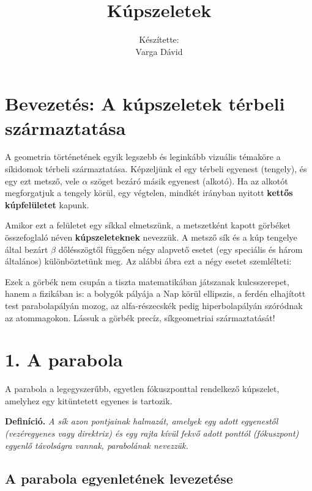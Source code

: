 \documentclass[12pt, a4paper]{article}
\newcommand{\textbfr}[1]{\textbf{\textcolor{bvred}{#1}}}
\begin{document}
\title{\textbfr{Kúpszeletek}}
\author{Készítette:\\Varga Dávid}
\date{}
\maketitle

\section*{Bevezetés: A kúpszeletek térbeli származtatása}

A geometria történetének egyik legszebb és leginkább vizuális témaköre a síkidomok térbeli származtatása. Képzeljünk el egy térbeli egyenest (tengely), és egy ezt metsző, vele $\alpha$ szöget bezáró másik egyenest (alkotó). Ha az alkotót megforgatjuk a tengely körül, egy végtelen, mindkét irányban nyitott \textbfr{kettős kúpfelületet} kapunk. 

Amikor ezt a felületet egy síkkal elmetszünk, a metszetként kapott görbéket összefoglaló néven \textbfr{kúpszeleteknek} nevezzük. A metsző sík és a kúp tengelye által bezárt $\beta$ dőlésszögtől függően négy alapvető esetet (egy speciális és három általános) különböztetünk meg. Az alábbi ábra ezt a négy esetet szemlélteti:



Ezek a görbék nem csupán a tiszta matematikában játszanak kulcsszerepet, hanem a fizikában is: a bolygók pályája a Nap körül ellipszis, a ferdén elhajított test parabolapályán mozog, az alfa-részecskék pedig hiperbolapályán szóródnak az atommagokon. Lássuk a görbék precíz, síkgeometriai származtatását!

\section*{1. A parabola}

A parabola a legegyszerűbb, egyetlen fókuszponttal rendelkező kúpszelet, amelyhez egy kitüntetett egyenes is tartozik.

\textbf{Definíció.} \textit{A sík azon pontjainak halmazát, amelyek egy adott egyenestől (vezéregyenes vagy direktrix) és egy rajta kívül fekvő adott ponttól (fókuszpont) egyenlő távolságra vannak, \textcolor{bvred}{parabolának} nevezzük.}

\subsection*{A parabola egyenletének levezetése}
\end{document}
